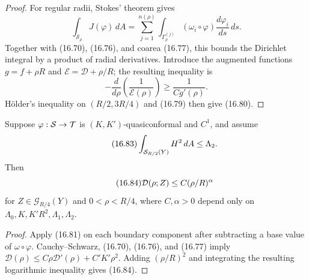 \begin{proof}
\sketch For regular radii, Stokes' theorem gives
\begin{equation}
\int_{\mathcal S_\rho}J(\varphi)\,dA
=\sum_{j=1}^{n(\rho)}\int_{\Gamma_\rho^{(j)}}
(\omega_i\circ\varphi)\frac{d\varphi_i}{ds}\,ds.
\tag{16.81}
\end{equation}
Together with (16.70), (16.76), and coarea (16.77), this bounds the
Dirichlet integral by a product of radial derivatives.  Introduce the
augmented functions $g=f+\rho R$ and
$\mathcal E=\mathcal D+\rho/R$; the resulting inequality is
\begin{equation}
-\frac d{d\rho}\left(\frac1{\mathcal E(\rho)}\right)
\ge\frac1{Cg'(\rho)}.
\tag{16.82}
\end{equation}
H\"older's inequality on $(R/2,3R/4)$ and (16.79) then give (16.80).
\end{proof}

\begin{theorem}\label{gilbarg-trudinger.thm.16.14.dirichlet-decay}
Suppose $\varphi:\mathcal{S}\to\mathcal{T}$ is $(K,K')$-quasiconformal and $C^1$, and assume
\begin{equation}\tag{16.83}
\int_{\mathcal{S}_{R/2}(Y)}H^2\,dA\leq\Lambda_2.
\end{equation}
Then
\begin{equation}\tag{16.84}
\mathcal{D}(\rho;Z)\leq C(\rho/R)^\alpha
\end{equation}
for $Z\in\mathcal G_{R/4}(Y)$ and $0<\rho<R/4$, where $C,\alpha>0$ depend only on $\Lambda_0,K,K'R^2,\Lambda_1,\Lambda_2$.
\end{theorem}
\begin{proof}
\sketch Apply (16.81) on each boundary component after subtracting a base value of $\omega\circ\varphi$. Cauchy--Schwarz, (16.70), (16.76), and (16.77) imply $\mathcal D(\rho)\leq C\rho\mathcal D'(\rho)+C'K'\rho^2$. Adding $(\rho/R)^2$ and integrating the resulting logarithmic inequality gives (16.84).
\end{proof}



